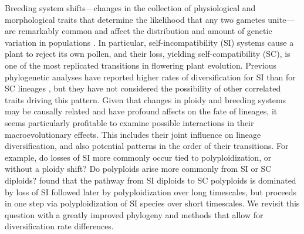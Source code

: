 Breeding system shifts---changes in the collection of physiological and morphological traits that determine the likelihood that any two gametes unite---are remarkably common and affect the distribution and amount of genetic variation in populations \citep{stebbins1974, barrett2013}.
In particular, self-incompatibility (SI) systems cause a plant to reject its own pollen, and their loss, yielding self-compatibility (SC), is one of the most replicated transitions in flowering plant evolution. %
Previous phylogenetic analyses have reported higher rates of diversification for SI than for SC lineages \citep{goldberg_2010, devos2014}, but they have not considered the possibility of other correlated traits driving this pattern.
Given that changes in ploidy and breeding systems may be causally related and have profound affects on the fate of lineages, it seems particularly profitable to examine possible interactions in their macroevolutionary effects.
This includes their joint influence on lineage diversification, and also potential patterns in the order of their transitions.
For example, do losses of SI more commonly occur tied to polyploidization, or without a ploidy shift?
Do polyploids arise more commonly from SI or SC diploids?
 found that the pathway from SI diploids to SC polyploids is dominated by loss of SI followed later by polyploidization over long timescales, but proceeds in one step via polyploidization of SI species over short timescales.
We revisit this question with a greatly improved phylogeny and methods that allow for diversification rate differences. %


